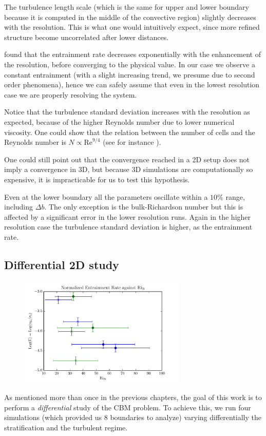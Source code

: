 The turbulence length scale (which is the same for upper and lower boundary because it is computed in the middle of the convective region) slightly decreases with the resolution. This is what one would intuitively expect, since more refined structure become uncorrelated after lower distances.

\cite{woodward} found that the entrainment rate decreases exponentially with the enhancement of the resolution, before converging to the physical value. In our case we observe a constant entrainment (with a slight increasing trend, we presume due to second order phenomena), hence we can safely assume that even in the lowest resolution case we are properly resolving the system. 

Notice that the turbulence standard deviation increases with the resolution as expected, because of the higher Reynolds number due to lower numerical viscosity. One could show that the relation between the number of cells and the Reynolds number is $N \propto \mathrm{Re}^{9/4}$ (see for instance \citet{coleman}). 

One could still point out that the convergence reached in a 2D setup does not imply a convergence in 3D, but because 3D simulations are computationally so expensive, it is impracticable for us to test this hypothesis.

Even at the lower boundary all the parameters oscillate within a $10 \%$ range, including $\Delta b$. The only exception is the bulk-Richardson number but this is affected by a significant error in the lower resolution runs. Again in the higher resolution case the turbulence standard deviation is higher, as the entrainment rate.



\subsection{Differential 2D study}

\begin{figure}[t!]
\centering
\includegraphics[width=0.7\textwidth]{./img/differential2d.pdf}
\caption{}
\label{fig:differential}
\centering
\end{figure}
As mentioned more than once in the previous chapters, the goal of this work is to perform a \textit{differential} study of the CBM problem. To achieve this, we run four simulations (which provided us 8 boundaries to analyze) varying differentially the stratification and the turbulent regime. 

